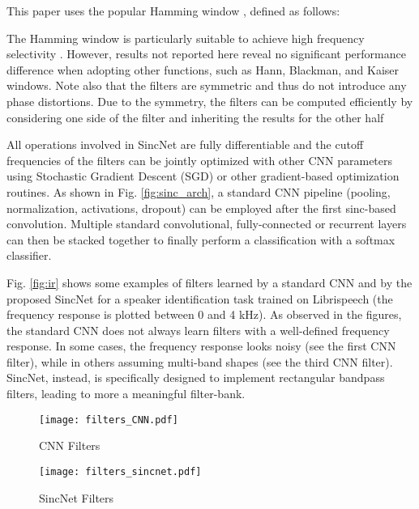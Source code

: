 \documentclass{article}
\begin{document}
This paper uses the popular Hamming window \cite{mitra}, defined as follows:

The Hamming window is particularly suitable to achieve high frequency selectivity \cite{mitra}. However, results not reported here reveal no significant performance difference when adopting other functions, such as Hann, Blackman, and Kaiser windows. Note also that the filters  are symmetric and thus do
not introduce any phase distortions. Due to the symmetry, the
filters can be computed efficiently by considering one side of
the filter and inheriting the results for the other half

All operations involved in SincNet are fully differentiable and the cutoff frequencies of the filters can be jointly optimized with other CNN parameters using Stochastic Gradient Descent (SGD) or other gradient-based optimization routines. 
As shown in Fig.  \ref{fig:sinc_arch}, a standard CNN pipeline (pooling, normalization, activations, dropout) can be employed after the first sinc-based convolution.
Multiple standard convolutional, fully-connected or recurrent layers \cite{gru2,ravanelli_is17,li_gru,ravanelli_twin} can then be stacked together to finally perform a  classification with a softmax classifier. 

Fig. \ref{fig:ir} shows some examples of filters learned by a standard CNN and by the proposed SincNet for a speaker identification task trained on Librispeech (the frequency response is plotted between 0 and 4 kHz). As observed in the figures, the standard CNN does not always learn filters with a well-defined frequency response. In some cases, the frequency response looks noisy (see the first CNN filter), while in others assuming  multi-band shapes (see the third CNN filter). SincNet, instead, is specifically designed to implement rectangular bandpass filters, leading to more a meaningful filter-bank. 


\begin{figure*}[t!]
\begin{subfigure}{0.5\textwidth}
\texttt{[image: filters\_CNN.pdf]}
\caption{CNN Filters}
\label{fig:cnn_filt}
\end{subfigure} \hspace{0.0\textwidth}
\begin{subfigure}{0.50\textwidth}
\texttt{[image: filters\_sincnet.pdf]}
\caption{SincNet Filters}
\label{fig:sinc_filt}
\end{subfigure}
\caption{Examples of filters learned by a standard CNN and by the proposed SincNet (using the Librispeech corpus on a speaker-id task). The first row reports the filters in the time domain, while the second one shows their magnitude frequency response.}
\label{fig:ir}
\end{figure*}
\end{document}
